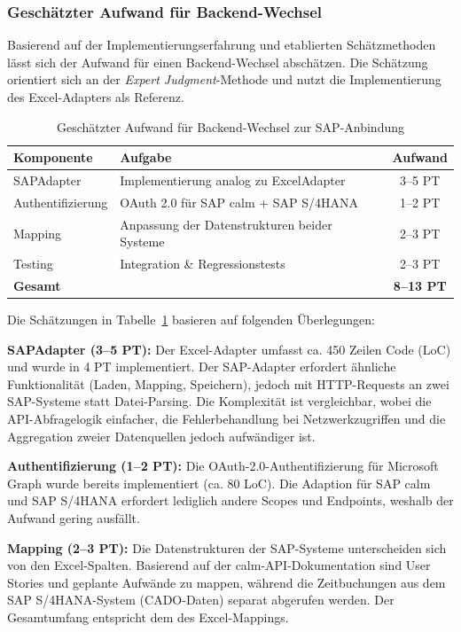 \subsubsection{Geschätzter Aufwand für Backend-Wechsel}

Basierend auf der Implementierungserfahrung und etablierten Schätzmethoden lässt sich der Aufwand für einen Backend-Wechsel abschätzen. Die Schätzung orientiert sich an der \textit{Expert Judgment}-Methode \citep{jorgensen2004} und nutzt die Implementierung des Excel-Adapters als Referenz.

\begin{table}[H]
\centering
\caption{Geschätzter Aufwand für Backend-Wechsel zur SAP-Anbindung}
\label{tab:aufwand}
\begin{tabularx}{\textwidth}{>{\raggedright\arraybackslash}Xlc}
\toprule
\textbf{Komponente} & \textbf{Aufgabe} & \textbf{Aufwand} \\
\midrule
SAPAdapter & Implementierung analog zu ExcelAdapter & 3--5 PT \\
Authentifizierung & OAuth 2.0 für SAP \gls{calm} + SAP S/4HANA & 1--2 PT \\
Mapping & Anpassung der Datenstrukturen beider Systeme & 2--3 PT \\
Testing & Integration \& Regressionstests & 2--3 PT \\
\midrule
\textbf{Gesamt} & & \textbf{8--13 PT} \\
\bottomrule
\end{tabularx}
\end{table}

Die Schätzungen in Tabelle~\ref{tab:aufwand} basieren auf folgenden Überlegungen:

\textbf{SAPAdapter (3--5 PT):} Der Excel-Adapter umfasst ca. 450 Zeilen Code (LoC) und wurde in 4 PT implementiert. Der SAP-Adapter erfordert ähnliche Funktionalität (Laden, Mapping, Speichern), jedoch mit HTTP-Requests an zwei SAP-Systeme statt Datei-Parsing. Die Komplexität ist vergleichbar, wobei die API-Abfragelogik einfacher, die Fehlerbehandlung bei Netzwerkzugriffen und die Aggregation zweier Datenquellen jedoch aufwändiger ist.

\textbf{Authentifizierung (1--2 PT):} Die OAuth-2.0-Authentifizierung für Microsoft Graph wurde bereits implementiert (ca. 80 LoC). Die Adaption für SAP \gls{calm} und SAP S/4HANA erfordert lediglich andere Scopes und Endpoints, weshalb der Aufwand gering ausfällt.

\textbf{Mapping (2--3 PT):} Die Datenstrukturen der SAP-Systeme unterscheiden sich von den Excel-Spalten. Basierend auf der \gls{calm}-API-Dokumentation \citep{sap2024calm} sind User Stories und geplante Aufwände zu mappen, während die Zeitbuchungen aus dem SAP S/4HANA-System (CADO-Daten) separat abgerufen werden. Der Gesamtumfang entspricht dem des Excel-Mappings.

